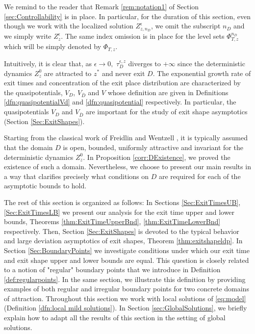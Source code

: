 \documentclass[10pt, reqno]{amsart}
\theoremstyle{definition}
\numberwithin{lem}{section}
\numberwithin{cor}{section}
\numberwithin{prop}{section}
\numberwithin{thm}{section}
\numberwithin{dfn}{section}
\begin{document}
 We remind to the reader that Remark \ref{rem:notation1} of Section \ref{sec:Controllability} is in place. In particular, for the duration of this section, even though we work with the localized solution $Z_{z,n_{D}}^\epsilon$, we omit the subscript $n_D$ and we simply write $Z_z^\epsilon$. The same index omission is in place for the level sets $\Phi^{n_D}_{T,z}$ which will be simply denoted by $\Phi_{T,z}.$

 
 Intuitively, it is clear that, as $\epsilon\to 0,$ $\tau_D^{\epsilon, z}$ diverges to $+\infty$  since the deterministic dynamics $Z_z^0$ are attracted to $z^*$ and never exit $D.$  The exponential growth rate of exit times and concentration of the exit place distribution are characterized by the quasipotentials, $V_D$, $V_{\bar{D}}$ and $V$ whose definition are given in Definitions  
  \ref{dfn:quasipotentialVd} and \ref{dfn:quasipotential} respectively. In particular, the quasipotentials $V_D$ and $V_{\bar{D}}$ are important for the study of exit shape asymptotics (Section \ref{Sec:ExitShapes}).

  Starting from the classical work of Freidlin and Wentzell \cite[Chapters 4, 6.5]{freidlin1998random}, it is typically assumed that the domain $D$ is open, bounded, uniformly attractive and invariant for the deterministic dynamics $Z^{0}_z.$ In Proposition \ref{corr:DExistence}, we proved the existence of such a domain. Nevertheless, we choose to present our main results in a way that clarifies precisely what conditions on $D$ are required for each of the  asymptotic bounds to hold. 

The rest of this section is organized as follows: In Sections \ref{Sec:ExitTimesUB}, \ref{Sec:ExitTimesLB} we present our analysis for the exit time upper and lower bounds, Theorems \ref{thm:ExitTimeUpperBnd}, \ref{thm:ExitTimeLowerBnd} respectively. Then, Section \ref{Sec:ExitShapes} is devoted to the typical behavior and large deviation asymptotics of exit shapes, Theorem \ref{thm:exitshapeldp}. In Section \ref{Sec:BoundaryPoints} we investigate conditions under which our exit time and exit shape upper and lower bounds are equal. This question is closely related to a notion of "regular" boundary points that we introduce in Definition \ref{def:regularpoints}. In the same section, we illustrate this definition by providing examples of both regular and irregular boundary points for two concrete domains of attraction. Throughout this section we work with local solutions of \eqref{eq:model} (Definition \ref{dfn:local mild solutions}). In Section \ref{sec:GlobalSolutions}, we briefly explain how to adapt all the results of this section in the setting of global solutions.
\end{document}
